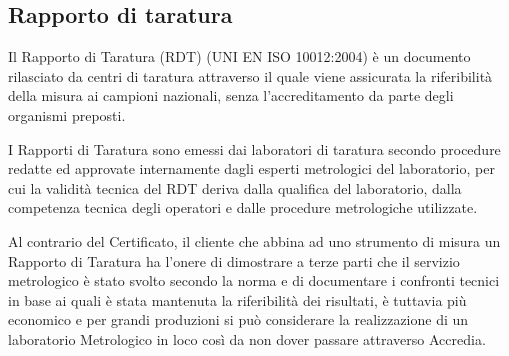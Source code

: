 \documentclass[a4paper, 15pt]{article}
\begin{document}
\subsection{Rapporto di taratura}
\begin{adjustwidth}{2in}{}      		
   		Il Rapporto di Taratura (RDT) (UNI EN ISO 10012:2004) è un
   		documento rilasciato da centri di taratura attraverso il quale viene assicurata
   		la riferibilità della misura ai campioni nazionali, senza l’accreditamento da
   		parte degli organismi preposti.
   		
   		I Rapporti di Taratura sono emessi dai laboratori di taratura secondo
   		procedure redatte ed approvate internamente dagli esperti metrologici del
   		laboratorio, per cui la validità tecnica del RDT deriva dalla qualifica del laboratorio, dalla
   		competenza tecnica degli operatori e dalle procedure metrologiche utilizzate.\newline 
   		
   		Al contrario del Certificato, il cliente che abbina ad uno strumento di misura un Rapporto di Taratura ha
   		l’onere di dimostrare a terze parti che il servizio metrologico è stato svolto
   		secondo la norma e di documentare i confronti tecnici in base ai quali è stata
   		mantenuta la riferibilità dei risultati, è tuttavia più economico e per grandi produzioni si può considerare la realizzazione di un laboratorio Metrologico in loco così da non dover passare attraverso Accredia. \newline 
   		

\end{adjustwidth}
\end{document}

